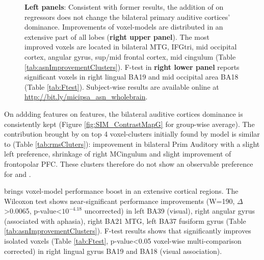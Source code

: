 \begin{figure}
    \centering
    \caption[Encoding with  Features, Group]{\textbf{Left panels}: Consistent with former results, the addition of  on  regressors does not change the bilateral primary auditive cortices' dominance. Improvements of voxel-models are distributed in an extensive part of all lobes (\textbf{right upper panel}). The most improved voxels are located in bilateral MTG, IFGtri, mid occipital cortex, angular gyrus, sup/mid frontal cortex, mid cingulum  (Table \ref{tab:asnImprovementClusters}). F-test in \textbf{right lower panel} reports significant voxels in right lingual BA19 and mid occipital area BA18 (Table \ref{tab:Ftest}). Subject-wise results are available online at \url{http://bit.ly/micipsa_asn_wholebrain}.} 
    \label{fig:ASN_ContrastMapG}
\end{figure}


On addding  features on  features, the bilateral auditive cortices dominance is consistently kept (Figure \ref{fig:SIM_ContrastMapG} for group-wise average). The contribution brought by  on top 4 voxel-clusters initially found by  model is similar to  (Table \ref{tab:rmsCluters}): improvement in bilateral Prim Auditory with a slight left preference, shrinkage of right MCingulum and slight improvement of frontopolar PFC. These clusters therefore do not show an observable preference for  and .

 brings voxel-model performance boost in an extensive cortical regions. The Wilcoxon test shows near-significant performance improvements (W=190, \(\Delta\)>0.0065, p-value<\(10^{-4.18}\) uncorrected) in left BA39 (visual), right angular gyrus (associated with aphasia), right BA21 MTG, left BA37 fusiform gyrus (Table \ref{tab:asnImprovementClusters}). F-test results shows that  significantly improves isolated voxels (Table \ref{tab:Ftest}, p-value<0.05 voxel-wise multi-comparison corrected) in right lingual gyrus BA19 and BA18 (visual association).
